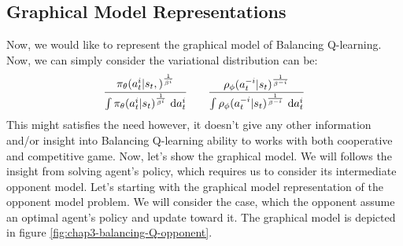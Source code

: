 \label{sec:chap3-prob-balancing-q}

\subsection{Graphical Model Representations}
Now, we would like to represent the graphical model of Balancing Q-learning. Now, we can simply consider the variational distribution can be:
\begin{equation}
    \cfrac{\pi_\theta(a^i_t | s_t,)^{\frac{1}{\beta^i}}}{\int  \pi_\theta(a^i_t | s_t)^{\frac{1}{\beta^i}}\ \mathrm{d} a^i_t} \qquad \frac{\rho_\phi(a^{-i}_t | s_t)^{\frac{1}{\beta^{-i}}}}{\int  \rho_\phi(a^{-i}_t | s_t)^{\frac{1}{\beta^{-i}}}\ \mathrm{d} a^i_t} 
\end{equation}
This might satisfies the need however, it doesn't give any other information and/or insight into Balancing Q-learning ability to works with both cooperative and competitive game. Now, let's show the graphical model. We will follows the insight from solving agent's policy, which requires us to consider its intermediate opponent model. Let's starting with the graphical model representation of the opponent model problem. We will consider the case, which the opponent assume an optimal agent's policy and update toward it. The graphical model is depicted in figure \ref{fig:chap3-balancing-Q-opponent}.
